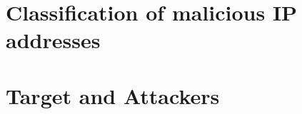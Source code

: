 \section{Classification of malicious IP addresses}

\section{Target and Attackers}



\begin{comment}
\section{Multidimensional graph}
We expect a data representation where we have a multipartitioned graph, meaning there is a number of different nodes representing different kinds of entities with multiple edges, representing different relations, in between the nodes. Hence, we will then obtain a multidimensional network. 

\section{Analysis}
As far as the analysis goes, we expect to perform clustering to identify communities and link analysis to find different paths between two nodes. The latter can easily be queried in Neo4j and is expected to contribute a great deal solving the different questions. We also expect to use of some statistical tools such as average node degree, degree distribution and network diameter.
\end{comment}